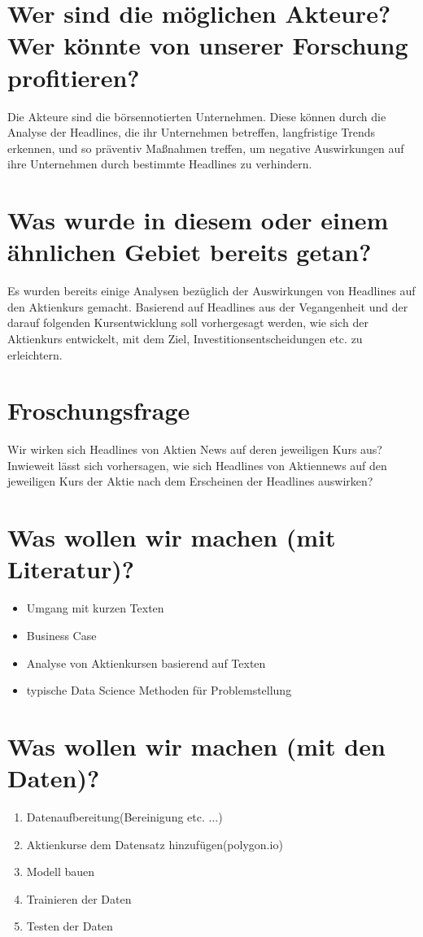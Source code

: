\section*{Wer sind die möglichen Akteure? Wer könnte von unserer Forschung profitieren?}
Die Akteure sind die börsennotierten Unternehmen. Diese können durch die Analyse der Headlines, die ihr Unternehmen betreffen, langfristige Trends erkennen, und so präventiv Maßnahmen treffen, um negative Auswirkungen auf ihre Unternehmen durch bestimmte Headlines zu verhindern.


\section*{Was wurde in diesem oder einem ähnlichen Gebiet bereits getan?}
Es wurden bereits einige Analysen bezüglich der Auswirkungen von Headlines auf den Aktienkurs gemacht. Basierend auf Headlines aus der Vegangenheit und der darauf folgenden Kursentwicklung soll vorhergesagt werden, wie sich der Aktienkurs entwickelt, mit dem Ziel, Investitionsentscheidungen etc. zu erleichtern.\\

\section*{Froschungsfrage}
Wir wirken sich Headlines von Aktien News auf deren jeweiligen Kurs aus?
Inwieweit lässt sich vorhersagen, wie sich Headlines von Aktiennews auf den jeweiligen Kurs der Aktie nach dem Erscheinen der Headlines auswirken? \\

\section*{Was wollen wir machen (mit Literatur)?}
\begin{itemize}
    \item Umgang mit kurzen Texten
    \item Business Case
    \item Analyse von Aktienkursen basierend auf Texten
    \item typische Data Science Methoden für Problemstellung
\end{itemize}
\section*{Was wollen wir machen (mit den Daten)?}
\begin{enumerate}
    \item Datenaufbereitung(Bereinigung etc. ...)
    \item Aktienkurse dem Datensatz hinzufügen(polygon.io)
    \item Modell bauen
    \item Trainieren der Daten
    \item Testen der Daten
\end{enumerate}


\citep[see][]{yahoofinance} \citep[see][]{econ_topicmodelling}
